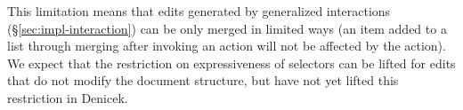 \documentclass[sigconf]{acmart}
\newcommand{\diff}[1]{{#1}}
\newcommand{\note}[1]{}
\newcommand{\ident}[1]{{\sffamily #1}}
\begin{document}
\note{Respond to R3's question about avoiding edits depending on values and R1's concern about
usefulness for PBD tools.}
\diff{This limitation means that edits generated by generalized interactions (\S\ref{sec:impl-interaction})
can be only merged in limited ways (an item added to a list through merging after
invoking an action will not be affected by the action). We expect that the restriction on
expressiveness of selectors can be lifted for edits that do not modify the document structure,
but have not yet lifted this restriction in Denicek.}

%
%


%
\end{document}
